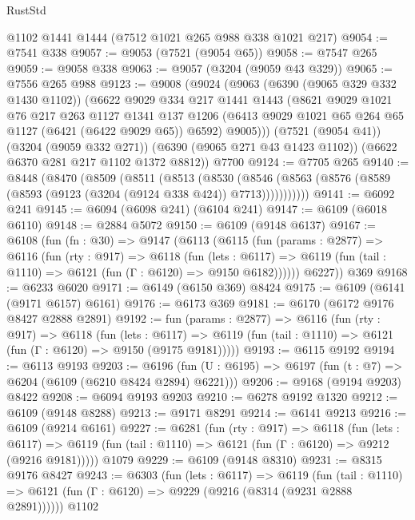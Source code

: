 \begin{lexlean}{RustStd}
\begin{coremodule}
    @1102
    @1441
    @1444
    (@7512 @1021 @265 @988 @338 @1021 @217)
@9054 := @7541 @338
@9057 := @9053 (@7521 (@9054 @65))
@9058 := @7547 @265
@9059 := @9058 @338
@9063 := @9057 (@3204 (@9059 @43 @329))
@9065 := @7556 @265 @988
@9123 := @9008
    (@9024
      (@9063
        (@6390 (@9065 @329 @332 @1430 @1102))
        (@6622
          @9029
          @334
          @217
          @1441
          @1443
          (@8621
            @9029
            @1021
            @76
            @217
            @263
            @1127
            @1341
            @137
            @1206
            (@6413 @9029 @1021 @65 @264 @65 @1127 (@6421 (@6422 @9029 @65)) @6592)
            @9005)))
      (@7521 (@9054 @41))
      (@3204 (@9059 @332 @271))
      (@6390 (@9065 @271 @43 @1423 @1102))
      (@6622 @6370 @281 @217 @1102 @1372 @8812))
    @7700
@9124 := @7705 @265
@9140 := @8448
    (@8470
      (@8509
        (@8511
          (@8513
            (@8530
              (@8546 (@8563 (@8576 (@8589 (@8593 (@9123 (@3204 (@9124 @338 @424)) @7713)))))))))))
@9141 := @6092 @241
@9145 := @6094 (@6098 @241) (@6104 @241)
@9147 := @6109 (@6018 @6110)
@9148 := @2884 @5072
@9150 := @6109 (@9148 @6137)
@9167 := @6108
    (fun (fn : @30) =>
    @9147
      (@6113
        (@6115
          (fun (params : @2877) =>
          @6116
            (fun (rty : @917) =>
            @6118
              (fun (lets : @6117) =>
              @6119 (fun (tail : @1110) => @6121 (fun (Γ : @6120) => @9150 @6182))))))
        @6227))
    @369
@9168 := @6233 @6020
@9171 := @6149 (@6150 @369) @8424
@9175 := @6109 (@6141 (@9171 @6157) @6161)
@9176 := @6173 @369
@9181 := @6170 (@6172 @9176 @8427 @2888 @2891)
@9192 := fun (params : @2877) =>
  @6116
    (fun (rty : @917) =>
    @6118
      (fun (lets : @6117) =>
      @6119 (fun (tail : @1110) => @6121 (fun (Γ : @6120) => @9150 (@9175 @9181)))))
@9193 := @6115 @9192
@9194 := @6113 @9193
@9203 := @6196 (fun (U : @6195) => @6197 (fun (t : @7) => @6204 (@6109 (@6210 @8424 @2894) @6221)))
@9206 := @9168 (@9194 @9203) @8422
@9208 := @6094 @9193 @9203
@9210 := @6278 @9192 @1320
@9212 := @6109 (@9148 @8288)
@9213 := @9171 @8291
@9214 := @6141 @9213
@9216 := @6109 (@9214 @6161)
@9227 := @6281
    (fun (rty : @917) =>
    @6118
      (fun (lets : @6117) =>
      @6119 (fun (tail : @1110) => @6121 (fun (Γ : @6120) => @9212 (@9216 @9181)))))
    @1079
@9229 := @6109 (@9148 @8310)
@9231 := @8315 @9176 @8427
@9243 := @6303
    (fun (lets : @6117) =>
    @6119
      (fun (tail : @1110) => @6121 (fun (Γ : @6120) => @9229 (@9216 (@8314 (@9231 @2888 @2891))))))
    @1102

\end{coremodule}
\end{lexlean}
